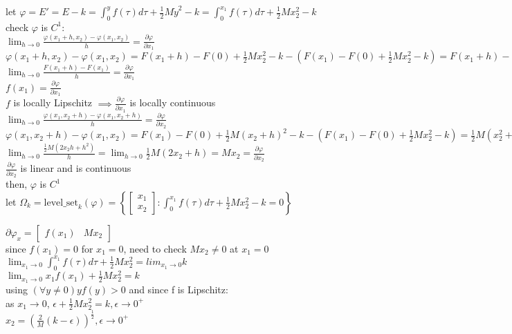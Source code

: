 \documentclass[12pt,letter]{article}
\begin{document}
\begin{itemize}
    let $\varphi=E'=E-k=\int_{0}^y f(\tau) d \tau + \frac{1}{2}M \dot{y}^2-k=\int_{0}^{x_1} f(\tau) d \tau + \frac{1}{2}M x_2^2-k$\\

    check $\varphi$ is $C^1$:\\
    
    $\lim_{h \to 0} \frac{\varphi(x_1+h,x_2)-\varphi(x_1,x_2)}{h}=\frac{ \partial \varphi}{\partial x_1}$\\
    $\varphi(x_1+h,x_2)-\varphi(x_1,x_2)=F(x_1+h)-F(0)+\frac{1}{2}M x_2^2-k-(F(x_1)-F(0)+\frac{1}{2}M x_2^2-k)=F(x_1+h)-F(x_1)$\\
    $\lim_{h \to 0}\frac{F(x_1+h)-F(x_1)}{h}=\frac{ \partial \varphi}{\partial x_1}$\\
    $f(x_1)=\frac{ \partial \varphi}{\partial x_1}$\\
    $f$ is locally Lipschitz $\implies \frac{ \partial \varphi}{\partial x_1}$ is locally continuous\\
    
    $\lim_{h \to 0} \frac{\varphi(x_1,x_2+h)-\varphi(x_1,x_2+h)}{h}=\frac{ \partial \varphi}{\partial x_2}$\\
    $\varphi(x_1,x_2+h)-\varphi(x_1,x_2)=F(x_1)-F(0)+\frac{1}{2}M (x_2+h)^2-k-(F(x_1)-F(0)+\frac{1}{2}M x_2^2-k)=\frac{1}{2}M(x_2^2+2x_2h+h^2 - x_2^2)=\frac{1}{2}M(2x_2h+h^2)$\\
    $\lim_{h \to 0} \frac{\frac{1}{2}M(2x_2h+h^2)}{h}=\lim_{h \to 0} \frac{1}{2}M(2x_2+h)=Mx_2=\frac{ \partial \varphi}{\partial x_2}$\\
    $\frac{\partial \varphi}{\partial x_2}$ is linear and is continuous\\

    then, $\varphi$ is $C^1$\\
    
    let $\Omega_k = \text{level\_set}_{k}(\varphi) = \left\{\begin{bmatrix}x_1 \\ x_2\end{bmatrix}: \int_{0}^{x_1} f(\tau) d \tau + \frac{1}{2}M x_2^2-k = 0 \right\}$

    $\partial \varphi_x = \begin{bmatrix} f(x_1) & M x_2\end{bmatrix}$\\

    since $f(x_1)=0$  for $x_1=0$, need to check $Mx_2 \neq 0$ at $x_1=0$\\
    $\lim_{x_1\rightarrow 0} \int_{0}^{x_1} f(\tau) d \tau + \frac{1}{2}M x_2^2=lim_{x_1\rightarrow 0}k$\\
    $\lim_{x_1\rightarrow 0}x_1 f(x_1) + \frac{1}{2}M x_2^2=k$\\
    using $(\forall y \neq 0) y f(y) > 0$ and since f is Lipschitz:\\
    as $x_1 \rightarrow 0$, $\epsilon + \frac{1}{2}M x_2^2=k, \epsilon \rightarrow 0^+$\\
    $x_2=(\frac{2}{M}(k-\epsilon))^{\frac{1}{2}}, \epsilon \rightarrow 0^+$\\


\end{itemize}
\end{document}
